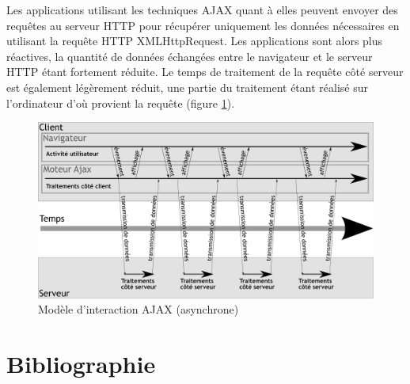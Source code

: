 \documentclass[
]{book}
\begin{document}
Les applications utilisant les techniques AJAX quant à elles peuvent
envoyer des requêtes au serveur HTTP pour récupérer uniquement les données
nécessaires en utilisant la requête HTTP XMLHttpRequest. Les applications
sont alors plus réactives, la quantité de données échangées entre le
navigateur et le serveur HTTP étant fortement réduite. Le temps de traitement
de la requête côté serveur est également légèrement réduit, une partie du
traitement étant réalisé sur l'ordinateur d'où provient la requête
(figure \ref{fig:ajax2}).

\begin{figure}
\centering
\includegraphics{img/ajax2.png}
\caption{\label{fig:ajax2}Modèle d'interaction AJAX (asynchrone)}
\end{figure}

\hypertarget{bibliographie}{%
\chapter*{Bibliographie}\label{bibliographie}}
\end{document}
